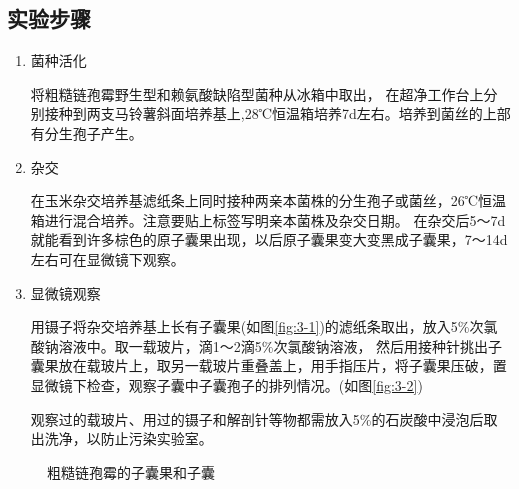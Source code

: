 \documentclass[]{LZUThesis}
\begin{document}
\subsection{实验步骤}
\begin{enumerate}
    \item 菌种活化\par
    将粗糙链孢霉野生型和赖氨酸缺陷型菌种从冰箱中取出，
    在超净工作台上分别接种到两支马铃薯斜面培养基上,28℃恒温箱培养7d左右。培养到菌丝的上部有分生孢子产生。
    \item 杂交\par
    在玉米杂交培养基滤纸条上同时接种两亲本菌株的分生孢子或菌丝，26℃恒温箱进行混合培养。注意要贴上标签写明亲本菌株及杂交日期。
    在杂交后5～7d就能看到许多棕色的原子囊果出现，以后原子囊果变大变黑成子囊果，7～14d左右可在显微镜下观察。
    \item 显微镜观察\par
    用镊子将杂交培养基上长有子囊果(如图\ref{fig:3-1})的滤纸条取出，放入5\%次氯酸钠溶液中。取一载玻片，滴1～2滴5\%次氯酸钠溶液，
    然后用接种针挑出子囊果放在载玻片上，取另一载玻片重叠盖上，用手指压片，将子囊果压破，置显微镜下检查，观察子囊中子囊孢子的排列情况。(如图\ref{fig:3-2})\par
    观察过的载玻片、用过的镊子和解剖针等物都需放入5\%的石炭酸中浸泡后取出洗净，以防止污染实验室。
\end{enumerate}
\begin{figure}[htbp]
    \centering
    \label{fig:3}
    \caption{粗糙链孢霉的子囊果和子囊}
\end{figure}
\end{document}
